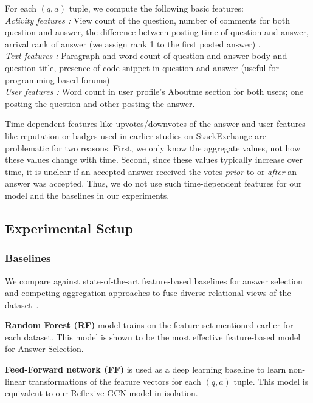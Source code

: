 For each $(q, a)$ tuple, we compute the following basic features:\\
\emph{Activity features :} View count of the question, number of comments for both question and answer, the difference between posting time of question and answer, arrival rank of answer (we assign rank 1 to the first posted answer) \cite{TianZL13}. \\
\emph{Text features :} Paragraph and word count of question and answer body and question title, presence of code snippet in question and answer (useful for programming based forums)\\
\emph{User features :} Word count in user profile's Aboutme section for both users; one posting the question and other posting the answer.

Time-dependent features like upvotes/downvotes of the answer and user features like reputation or badges used in earlier studies on StackExchange \cite{BurelMA16} are problematic for two reasons. First, we only know the aggregate values, not how these values change with time. Second, since these values typically increase over time, it is unclear if an accepted answer received the votes \emph{prior} to or \emph{after} an answer was accepted. Thus, we do not use such time-dependent features for our model and the baselines in our experiments.


\subsection{Experimental Setup}
\subsubsection{Baselines} We compare against state-of-the-art feature-based baselines for answer selection and competing aggregation approaches to fuse diverse relational views of the dataset~\cite{DualGCN,relationalGCN}.

\noindent
\textbf{Random Forest (RF)} \cite{BurelMA16,TianZL13} model trains on the feature set mentioned earlier for each dataset. This model is shown to be the most effective feature-based model for Answer Selection.

\noindent
\textbf{Feed-Forward network (FF)} \cite{JendersKN16} is used as a deep learning baseline to learn non-linear transformations of the feature vectors for each $(q, a)$ tuple. This model is equivalent to our Reflexive GCN model in isolation.

